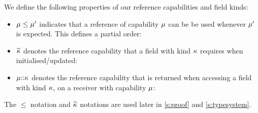We define the following properties of our reference capabilities and field kinds:
\begin{itemize}
	\item $\mu \leq \mu'$ indicates that a reference of capability $\mu$ can be be used whenever 
    $\mu'$ is expected. This defines a partial order:\\
	\SS[1]
	
	\item $\widetilde{\kappa}$ denotes the reference capability that a field with kind $\kappa$ requires when initialised/updated:\\
	\SS[1]
	
	\item $\mu{::}\kappa$ denotes the reference capability that is returned when accessing a field with kind $\kappa$, on a receiver with capability $\mu$:\\
	\SS[1]
\end{itemize}

The $\leq$ notation and $\widetilde{\kappa}$ notations are used later in \ref{s:proof} and \ref{s:typesystem}.

